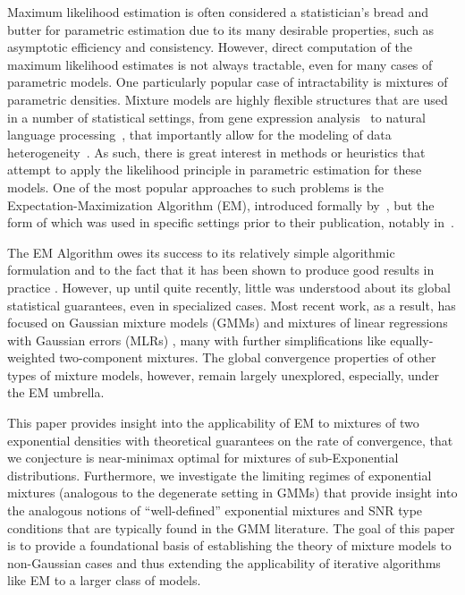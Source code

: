 \documentclass[runningheads]{llncs}
\begin{document}
Maximum likelihood estimation is often considered a statistician's bread and
butter for parametric estimation due to its many desirable properties, such as
asymptotic efficiency and consistency. However, direct computation of the
maximum likelihood estimates is not always tractable, even for many cases of
parametric models. One particularly popular case of intractability is mixtures
of parametric densities. Mixture models are highly flexible structures
that are used in a number of statistical settings, from gene expression
analysis~\cite{ghosh2002mixture}
to natural language processing~\cite{blei2003latent}, that importantly allow
for the modeling of data heterogeneity~\cite{mclachlan2019finite}. As such,
there is great interest in methods or heuristics that attempt to apply the
likelihood principle in parametric estimation for these models. One of the most
popular approaches to such problems is the Expectation-Maximization Algorithm
(EM), introduced formally by~\cite{dempster1977maximum}, but the form of which
was used in specific settings prior to their publication, notably
in~\cite{baum1970maximization, sundberg1974maximum}.

The EM Algorithm owes its success to its relatively simple algorithmic
formulation and to the fact that it has been shown to produce good results in
practice \cite{redner1984mixture, daskalakis2017ten}.
However, up until quite recently, little was understood about its global
statistical guarantees, even in specialized cases. Most recent work, as a
result, has focused on Gaussian mixture models (GMMs)
\cite[and references therein]{wu2019randomly,
  zhao2020statistical, dwivedi2020singularity} and
mixtures of linear regressions with Gaussian errors (MLRs) \cite{kwon2019global,
  kwon2020converges, tao2024convergence}, many with further simplifications like
equally-weighted two-component mixtures. The
global convergence properties of other types of mixture models, however, remain
largely unexplored, especially, under the EM umbrella.

This paper provides insight into the applicability of EM to mixtures of two
exponential densities with theoretical guarantees on the rate of convergence,
that we conjecture is near-minimax optimal for mixtures of sub-Exponential
distributions. Furthermore, we investigate the
limiting regimes of exponential mixtures (analogous to the degenerate setting in
GMMs) that provide insight into the analogous notions of ``well-defined'' exponential mixtures
and SNR type conditions that are typically found in the GMM literature.
The goal of this paper is to provide a foundational basis of establishing the
theory of mixture models to non-Gaussian cases and thus extending the
applicability of iterative algorithms like EM to a larger class of models.
\end{document}
